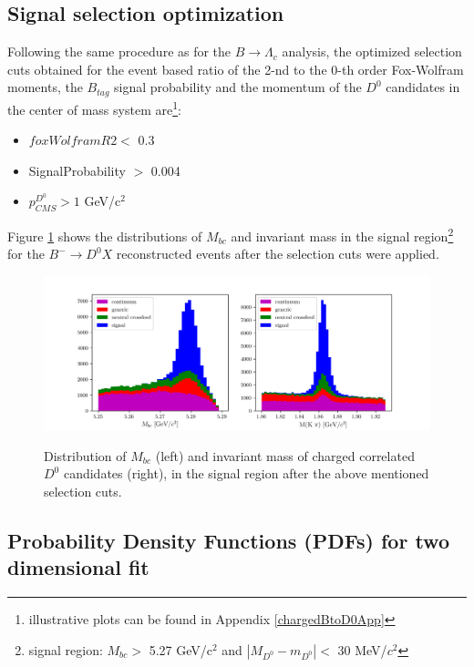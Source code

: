 \subsection{Signal selection optimization}\label{Sec:SigSelectionOpt}

Following the same procedure as for the $B \rightarrow \Lambda_c$ analysis, the optimized selection cuts obtained for the event based ratio
of the 2-nd to the 0-th order Fox-Wolfram moments, the $B_{tag}$ signal probability and the momentum of the $D^0$ candidates in the center of mass system are\footnote{illustrative plots can be found in Appendix \ref{chargedBtoD0App}}:
\begin{itemize}
\item $foxWolframR2 <$ 0.3
\item SignalProbability $>$ 0.004
\item $p^{D^0 }_{CMS} > 1$ GeV/c$^2$
\end{itemize}

 \noindent Figure \ref{fig:chargedControlD0_Mbc_InvM_opt_SignalRegion} shows the distributions of $M_{bc}$ and invariant mass in the signal region\footnote{signal region: $M_{bc}  > $ 5.27 GeV/c$^2$ and $|M_{D^0}  - m_{D^0}| < $   30  MeV/$c^2$}  for the $B^- \rightarrow D^0 X$ reconstructed events after the selection cuts were applied.

\begin{figure}[h!]
\centering
{\includegraphics[width=1.2\textwidth]{05-chargedControlSample/figs/rel5_chargedBtoD0bar_Mbc_InvM_opt_SigRegion.png}}
\caption{Distribution of $M_{bc}$ (left) and invariant mass of charged correlated  $D^0 $ candidates (right), in the signal region after the above mentioned selection cuts.}
\label{fig:chargedControlD0_Mbc_InvM_opt_SignalRegion}
\end{figure}

\vspace{1 cm}

\subsection{Probability Density Functions (PDFs) for two dimensional fit}

